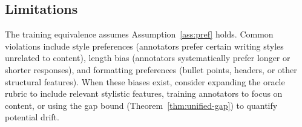 \subsection{Limitations}

The training equivalence assumes Assumption~\ref{ass:pref} holds. Common violations include style preferences (annotators prefer certain writing styles unrelated to content), length bias (annotators systematically prefer longer or shorter responses), and formatting preferences (bullet points, headers, or other structural features). When these biases exist, consider expanding the oracle rubric to include relevant stylistic features, training annotators to focus on content, or using the gap bound (Theorem~\ref{thm:unified-gap}) to quantify potential drift.
